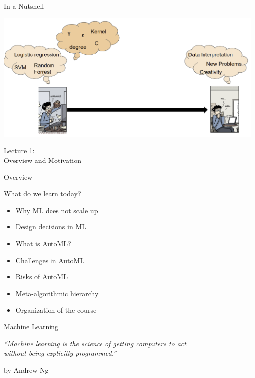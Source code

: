\begin{frame}[c]{In a Nutshell}

\includegraphics[width=0.99\textwidth]{images/automl_comic}

\end{frame}
\begin{frame}[c]{}

\centering
\huge
Lecture 1:\\
Overview and Motivation
\end{frame}
\begin{frame}[c]{Overview}

What do we learn today?

\begin{itemize}
  \item Why ML does not scale up
  \item Design decisions in ML 
  \item What is AutoML? 
  \item Challenges in AutoML
  \item Risks of AutoML
  \item Meta-algorithmic hierarchy 
  \item Organization of the course
\end{itemize}

\end{frame}
\begin{frame}[c]{Machine Learning}

\centering
\textit{``Machine learning is the science of getting computers to act\\
 without being explicitly programmed.''}

\hfill by Andrew Ng

\end{frame}
